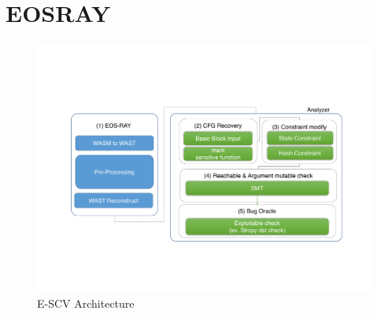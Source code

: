 \section{EOSRAY}
\begin{figure}[!h] %
  \centering
  \includegraphics[width=\linewidth]{figures/scalableval.pdf}
  \caption{E-SCV Architecture}

\end{figure} 
